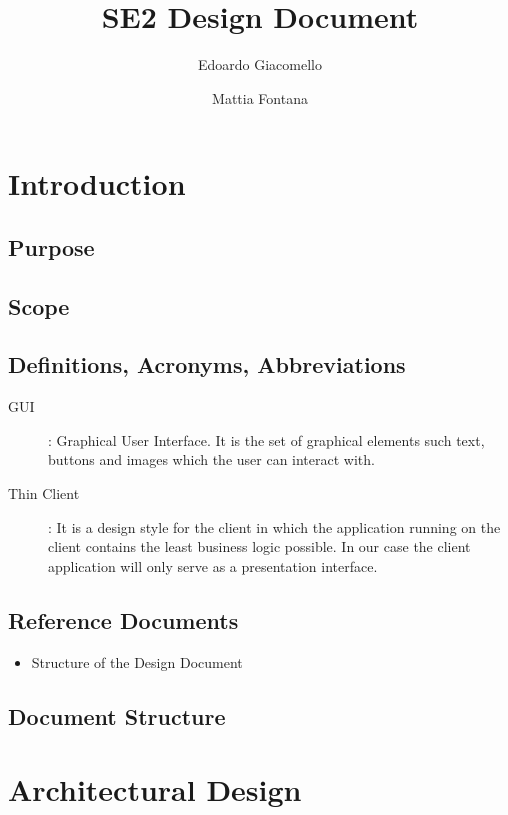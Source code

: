 \documentclass[11pt, a4paper,titlepage]{article}
\author{Edoardo Giacomello \and Mattia Fontana}
\title{SE2 Design Document}
\begin{document}
\maketitle
\tableofcontents
\newpage
\section{Introduction}
\subsection{Purpose}
\subsection{Scope}
\subsection{Definitions, Acronyms, Abbreviations}
\begin{description}
	\item[GUI]: Graphical User Interface. It is the set of graphical elements such text, buttons and images which the user can interact with.
	\item[Thin Client]: It is a design style for the client in which the application running on the client contains the least business logic possible. In our case the client application will only serve as a presentation interface.
\end{description}
\subsection{Reference Documents}
	\begin{itemize}
		\item Structure of the Design Document
	\end{itemize}
\subsection{Document Structure}

\section{Architectural Design}
\end{document}
